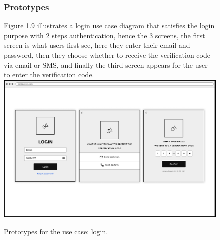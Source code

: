 \documentclass[]{uc2pfecaneva}
\begin{document}
    \begin{figure}[h]
        \subsubsection{Prototypes}
        \raggedright Figure 1.9 illustrates a login use case diagram that satisfies the login purpose with 2 steps authentication, hence the 3 screens, the first screen is what users first see, here they enter their email and password, then they choose whether to receive the verification code via email or SMS, and finally the third screen appears for the user to enter the verification code.
        \linebreak
        \includegraphics[width=\textwidth]{images/login1}
        \caption{Prototypes for the use case: login.}
    \end{figure}
    \clearpage
\end{document}
